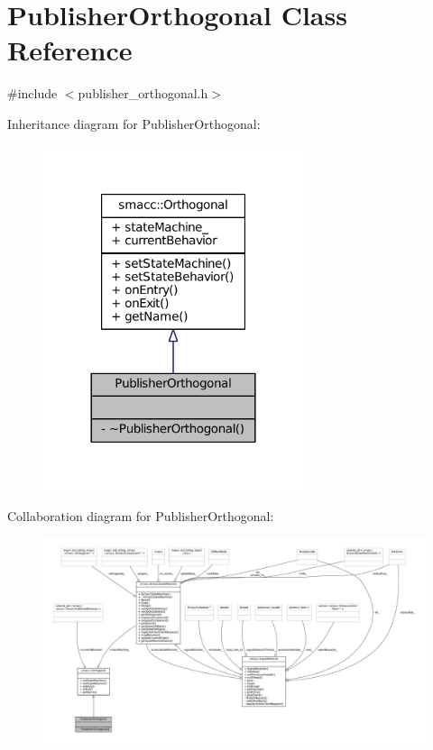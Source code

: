 \hypertarget{classPublisherOrthogonal}{}\section{Publisher\+Orthogonal Class Reference}
\label{classPublisherOrthogonal}


{\ttfamily \#include $<$publisher\+\_\+orthogonal.\+h$>$}



Inheritance diagram for Publisher\+Orthogonal\+:
\nopagebreak
\begin{figure}[H]
\begin{center}
\leavevmode
\includegraphics[width=216pt]{classPublisherOrthogonal__inherit__graph}
\end{center}
\end{figure}


Collaboration diagram for Publisher\+Orthogonal\+:
\nopagebreak
\begin{figure}[H]
\begin{center}
\leavevmode
\includegraphics[width=350pt]{classPublisherOrthogonal__coll__graph}
\end{center}
\end{figure}
